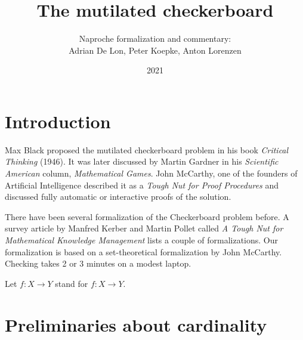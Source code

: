 \documentclass{article}
\title{The mutilated checkerboard}
\author{Naproche formalization and commentary:\\ Adrian De Lon, Peter Koepke, Anton Lorenzen}
\date{2021}
\begin{document}
\maketitle





\section{Introduction}

Max Black proposed the mutilated checkerboard problem in his book
\textit{Critical Thinking} (1946).
%
It was later discussed by Martin Gardner in his
\textit{Scientific American} column, \textit{Mathematical Games}.
%
John McCarthy, one of the
founders of Artificial Intelligence described it as a
\textit{Tough Nut for Proof Procedures}
and discussed fully automatic or interactive proofs of the solution.

There have been several formalization of the Checkerboard problem before. A
survey article by Manfred Kerber and Martin Pollet called \emph{A Tough Nut
for Mathematical Knowledge Management} lists a couple of formalizations.
Our formalization is based on a set-theoretical formalization by John McCarthy.
Checking takes 2 or 3 minutes on a modest laptop.


    \begin{forthel}

        Let $f : X\to Y$ stand for $f : X\rightarrow Y$.
    \end{forthel}


\section{Preliminaries about cardinality}
\end{document}
